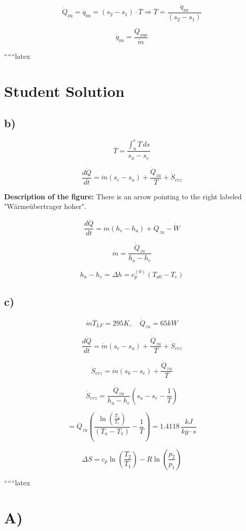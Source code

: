 \[
\dot{Q}_{\text{zu}} = \dot{q}_{\text{zu}} = (s_2 - s_1) \cdot \overline{T} \Rightarrow \overline{T} = \frac{\dot{q}_{\text{zu}}}{(s_2 - s_1)}
\]

\[
\dot{q}_{\text{zu}} = \frac{Q_{\text{aus}}}{\dot{m}}
\]

``````latex


\section*{Student Solution}

\subsection*{b)}

\[
\overline{T} = \frac{\int_{a}^{e} T \, ds}{s_a - s_e}
\]

\[
\frac{d\dot{Q}}{dt} = \dot{m} (s_e - s_a) + \frac{\dot{Q}_{zu}}{T} + \dot{S}_{erz}
\]

\textbf{Description of the figure:} There is an arrow pointing to the right labeled "Wärmeübertrager hoher".

\[
\frac{d\dot{Q}}{dt} = \dot{m} (h_e - h_a) + \dot{Q}_{zu} - \dot{W}
\]

\[
\dot{m} = \frac{\dot{Q}_{zu}}{h_a - h_e}
\]

\[
h_a - h_e = \Delta h = c_p^{(0)} (T_{a0} - T_e)
\]

\subsection*{c)}

\[
\dot{m} \overline{T}_{LF} = 295K, \quad \dot{Q}_{zu} = 65kW
\]

\[
\frac{d\dot{Q}}{dt} = \dot{m} (s_e - s_a) + \frac{\dot{Q}_{zu}}{T} + \dot{S}_{erz}
\]

\[
\dot{S}_{erz} = \dot{m} (s_{k} - s_{e}) + \frac{\dot{Q}_{zu}}{T}
\]

\[
\dot{S}_{erz} = \frac{\dot{Q}_{zu}}{h_a - h_e} \left( s_{a} - s_{e} - \frac{1}{T} \right)
\]

\[
= \dot{Q}_{zu} \left( \frac{\ln \left( \frac{T_a}{T_e} \right)}{(T_a - T_1)} - \frac{1}{T} \right) = 1.4118 \, \frac{kJ}{kg \cdot s}
\]

\[
\Delta S = c_p \ln \left( \frac{T_2}{T_1} \right) - R \ln \left( \frac{p_2}{p_1} \right)
\]

``````latex


\section*{A)}

